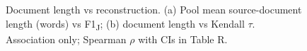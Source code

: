 \begin{figure}[t]\centering

\caption{Document length vs reconstruction. (a) Pool mean source-document length (words) vs F1\textsubscript{J}; (b) document length vs Kendall $\tau$. Association only; Spearman $\rho$ with CIs in Table R.}
\label{fig:6}
\end{figure}
